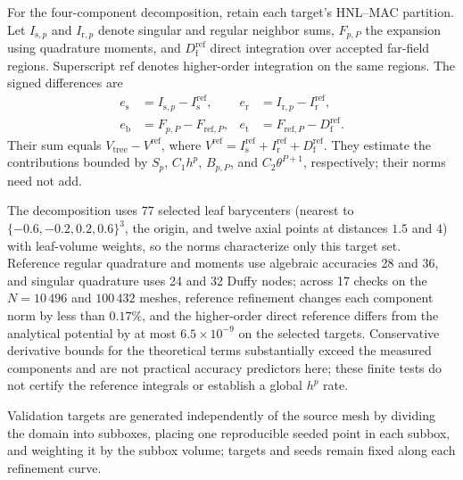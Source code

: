 \documentclass[a4paper,pdflatex,sn-mathphys-num]{sn-jnl}
\theoremstyle{thmstyleone}
\begin{document}
For the four-component decomposition, retain each target's HNL--MAC partition. Let $I_{\mathrm s,p}$ and $I_{\mathrm r,p}$ denote singular and regular neighbor sums, $F_{p,P}$ the expansion using quadrature moments, and $D_{\mathrm f}^{\mathrm{ref}}$ direct integration over accepted far-field regions. Superscript $\mathrm{ref}$ denotes higher-order integration on the same regions. The signed differences are
\begin{equation}
\begin{aligned}
e_{\mathrm s}&=I_{\mathrm s,p}-I_{\mathrm s}^{\mathrm{ref}},&
e_{\mathrm r}&=I_{\mathrm r,p}-I_{\mathrm r}^{\mathrm{ref}},\\
e_{\mathrm b}&=F_{p,P}-F_{\mathrm{ref},P},&
e_{\mathrm t}&=F_{\mathrm{ref},P}-D_{\mathrm f}^{\mathrm{ref}}.
\end{aligned}
\label{eq:four_error_differences}
\end{equation}
Their sum equals $V_{\mathrm{tree}}-V^{\mathrm{ref}}$, where $V^{\mathrm{ref}}=I_{\mathrm s}^{\mathrm{ref}}+I_{\mathrm r}^{\mathrm{ref}}+D_{\mathrm f}^{\mathrm{ref}}$. They estimate the contributions bounded by $S_p$, $C_1h^p$, $B_{p,P}$, and $C_2\theta^{P+1}$, respectively; their norms need not add.

The decomposition uses 77 selected leaf barycenters (nearest to $\{-0.6,-0.2,0.2,0.6\}^3$, the origin, and twelve axial points at distances $1.5$ and $4$) with leaf-volume weights, so the norms characterize only this target set. Reference regular quadrature and moments use algebraic accuracies 28 and 36, and singular quadrature uses 24 and 32 Duffy nodes; across 17 checks on the $N=10\,496$ and $100\,432$ meshes, reference refinement changes each component norm by less than $0.17\%$, and the higher-order direct reference differs from the analytical potential by at most $6.5\times10^{-9}$ on the selected targets. Conservative derivative bounds for the theoretical terms substantially exceed the measured components and are not practical accuracy predictors here; these finite tests do not certify the reference integrals or establish a global $h^p$ rate.

\label{app:sampling_truncation}
Validation targets are generated independently of the source mesh by dividing the domain into subboxes, placing one reproducible seeded point in each subbox, and weighting it by the subbox volume; targets and seeds remain fixed along each refinement curve.
\end{document}
